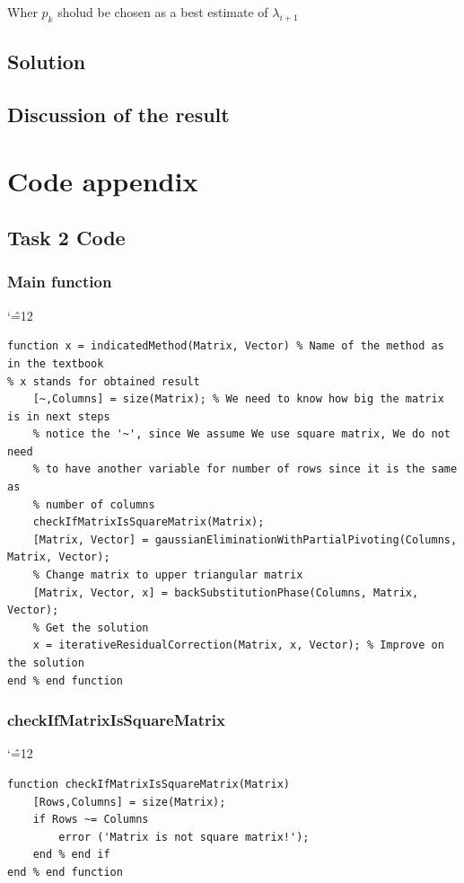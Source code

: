 \documentclass[12pt]{report}
\newenvironment{simplechar}{%
   \catcode`\^=12
}{}
\begin{document}
Wher $p_k$ sholud be chosen as a best estimate of $\lambda_{i+1}$

\section{Solution}

\section{Discussion of the result}

\chapter{Code appendix}

\section{Task 2 Code}

\subsection{Main function}
\begin{simplechar}
\begin{lstlisting}
function x = indicatedMethod(Matrix, Vector) % Name of the method as in the textbook
% x stands for obtained result
    [~,Columns] = size(Matrix); % We need to know how big the matrix is in next steps
    % notice the '~', since We assume We use square matrix, We do not need
    % to have another variable for number of rows since it is the same as
    % number of columns
    checkIfMatrixIsSquareMatrix(Matrix);
    [Matrix, Vector] = gaussianEliminationWithPartialPivoting(Columns, Matrix, Vector);
    % Change matrix to upper triangular matrix
    [Matrix, Vector, x] = backSubstitutionPhase(Columns, Matrix, Vector);
    % Get the solution
    x = iterativeResidualCorrection(Matrix, x, Vector); % Improve on the solution
end % end function
\end{lstlisting}
\end{simplechar}

\subsection{checkIfMatrixIsSquareMatrix}
\begin{simplechar}
\begin{lstlisting}
function checkIfMatrixIsSquareMatrix(Matrix)
    [Rows,Columns] = size(Matrix);
    if Rows ~= Columns
        error ('Matrix is not square matrix!');
    end % end if
end % end function
\end{lstlisting}
\end{simplechar}
\end{document}
